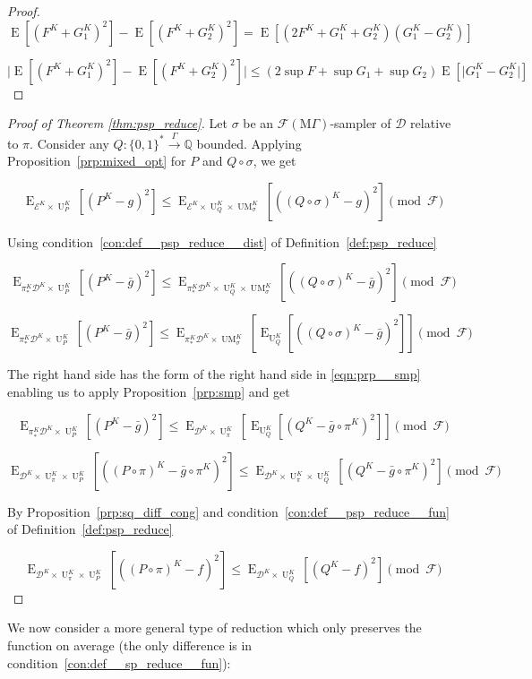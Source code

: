 \documentclass{article}
\numberwithin{equation}{section}
\theoremstyle{definition}
\theoremstyle{plain}
\newcommand{\Bool}{\{0,1\}}
\newcommand{\Words}{{\Bool^*}}
\DeclareMathOperator{\E}{E}
\DeclareMathOperator{\UM}{UM}
\DeclareMathOperator{\Un}{U}
\newcommand{\Rats}{\mathbb{Q}}
\newcommand{\Abs}[1]{\lvert #1 \rvert}
\newcommand{\Dist}{\mathcal{D}}
\newcommand{\MGrow}{\mathrm{M}\Gamma}
\newcommand{\Fall}{\mathcal{F}}
\newcommand{\EMG}{\Fall(\MGrow)}
\newcommand{\Scheme}{\xrightarrow{\Gamma}}
\begin{document}
\begin{proof}

\[\E[(F^K + G_1^K)^2] - \E[(F^K + G_2^K)^2] = \E[(2 F^K + G_1^K + G_2^K)(G_1^K - G_2^K)]\]

\[\Abs{\E[(F^K + G_1^K)^2] - \E[(F^K + G_2^K)^2]} \leq (2 \sup F + \sup G_1 + \sup G_2) \E[\Abs{G_1^K - G_2^K}]\]
%
\end{proof}

\begin{proof}[Proof of Theorem \ref{thm:psp_reduce}]

Let ${\sigma}$ be an ${\EMG}$-sampler of ${\Dist}$ relative to ${\pi}$. Consider any ${Q: \Words \Scheme \Rats}$ bounded. Applying Proposition~\ref{prp:mixed_opt} for ${P}$ and ${Q \circ \sigma}$, we get

\[\E_{\mathcal{E}^{K} \times \Un_P^K}[(P^K-g)^2] \leq \E_{\mathcal{E}^{K} \times \Un_Q^K \times \UM_\sigma^K}[((Q \circ \sigma)^K - g)^2] \pmod \Fall\]

Using condition~\ref{con:def__psp_reduce__dist} of Definition~\ref{def:psp_reduce}

\[\E_{\pi_*^K\Dist^{K} \times \Un_P^K}[(P^K-\bar{g})^2] \leq \E_{\pi_*^K\Dist^{K} \times \Un_Q^K \times \UM_\sigma^K}[((Q \circ \sigma)^K - \bar{g})^2] \pmod \Fall\]

\[\E_{\pi_*^K\Dist^{K} \times \Un_P^K}[(P^K-\bar{g})^2] \leq \E_{\pi_*^K\Dist^{K} \times \UM_\sigma^K}[\E_{\Un_Q^K}[((Q \circ \sigma)^K - \bar{g})^2]] \pmod \Fall\]

The right hand side has the form of the right hand side in \ref{eqn:prp__smp} enabling us to apply Proposition~\ref{prp:smp} and get

\[\E_{\pi_*^K\Dist^{K} \times \Un_P^K}[(P^K-\bar{g})^2] \leq \E_{\Dist^{K} \times \Un_\pi^K}[\E_{\Un_Q^K}[(Q^K - \bar{g} \circ \pi^K)^2]] \pmod \Fall\]

\[\E_{\Dist^{K} \times \Un_\pi^K \times \Un_P^K}[((P \circ \pi)^K-\bar{g} \circ \pi^K)^2] \leq \E_{\Dist^{K} \times \Un_\pi^K \times \Un_Q^K}[(Q^K - \bar{g} \circ \pi^K)^2] \pmod \Fall\]

By Proposition~\ref{prp:sq_diff_cong} and condition~\ref{con:def__psp_reduce__fun} of Definition~\ref{def:psp_reduce}

\[\E_{\Dist^{K} \times \Un_\pi^K \times \Un_P^K}[((P \circ \pi)^K-f)^2] \leq \E_{\Dist^{K} \times \Un_Q^K}[(Q^K - f)^2] \pmod \Fall\]
%
\end{proof}

We now consider a more general type of reduction which only preserves the function on average (the only difference is in condition~\ref{con:def__sp_reduce__fun}):
\end{document}
